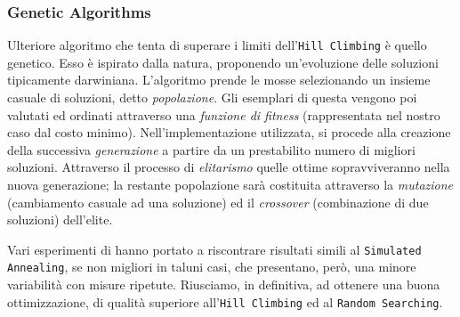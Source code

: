 			\subsubsection{Genetic Algorithms}
				Ulteriore algoritmo che tenta di superare i limiti dell'\texttt{Hill Climbing} è quello genetico. Esso è ispirato dalla natura, proponendo un'evoluzione delle soluzioni tipicamente darwiniana. L'algoritmo prende le mosse selezionando un insieme casuale di soluzioni, detto \emph{popolazione}. Gli esemplari di questa vengono poi valutati ed ordinati attraverso una \emph{funzione di fitness} (rappresentata nel nostro caso dal costo minimo). Nell'implementazione utilizzata, si procede alla creazione della successiva \emph{generazione} a partire da un prestabilito numero di migliori soluzioni. Attraverso il processo di \emph{elitarismo} quelle ottime sopravviveranno nella nuova generazione; la restante popolazione sarà costituita attraverso la \emph{mutazione} (cambiamento casuale ad una soluzione) ed il \emph{crossover} (combinazione di due soluzioni) dell'elite.\par
				Vari esperimenti di hanno portato a riscontrare risultati simili  al \texttt{Simulated Annealing}, se non migliori in taluni casi, che presentano, però, una minore variabilità con misure ripetute. Riusciamo, in definitiva, ad ottenere una buona ottimizzazione, di qualità superiore all'\texttt{Hill Climbing} ed al \texttt{Random Searching}.
